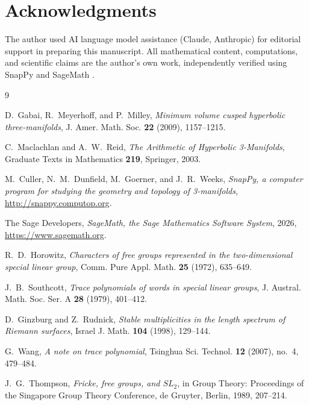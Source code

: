\documentclass[11pt,a4paper]{article}
\theoremstyle{definition}
\theoremstyle{remark}
\begin{document}
\section*{Acknowledgments}

The author used AI language model assistance (Claude, Anthropic) for
editorial support in preparing this manuscript. All mathematical
content, computations, and scientific claims are the author's own
work, independently verified using SnapPy \cite{SnapPy} and
SageMath \cite{Sage}.

\begin{thebibliography}{9}

D.~Gabai, R.~Meyerhoff, and P.~Milley,
\emph{Minimum volume cusped hyperbolic three-manifolds},
J. Amer. Math. Soc. \textbf{22} (2009), 1157--1215.

C.~Maclachlan and A.~W.~Reid,
\emph{The Arithmetic of Hyperbolic 3-Manifolds},
Graduate Texts in Mathematics \textbf{219}, Springer, 2003.

M.~Culler, N.~M.~Dunfield, M.~Goerner, and J.~R.~Weeks,
\emph{SnapPy, a computer program for studying the geometry and
topology of 3-manifolds}, \url{http://snappy.computop.org}.

The Sage Developers,
\emph{SageMath, the Sage Mathematics Software System}, 2026,
\url{https://www.sagemath.org}.

R.~D.~Horowitz,
\emph{Characters of free groups represented in the two-dimensional
special linear group},
Comm. Pure Appl. Math. \textbf{25} (1972), 635--649.

J.~B.~Southcott,
\emph{Trace polynomials of words in special linear groups},
J. Austral. Math. Soc. Ser. A \textbf{28} (1979), 401--412.

D.~Ginzburg and Z.~Rudnick,
\emph{Stable multiplicities in the length spectrum of Riemann surfaces},
Israel J. Math. \textbf{104} (1998), 129--144.

G.~Wang,
\emph{A note on trace polynomial},
Tsinghua Sci. Technol. \textbf{12} (2007), no.~4, 479--484.

J.~G.~Thompson,
\emph{Fricke, free groups, and $SL_2$},
in Group Theory: Proceedings of the Singapore Group Theory Conference,
de Gruyter, Berlin, 1989, 207--214.

\end{thebibliography}
\end{document}
